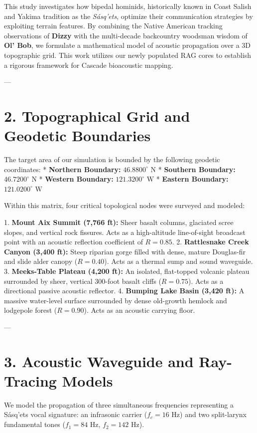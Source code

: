 \documentclass[11pt,twocolumn]{article}
\begin{document}
This study investigates how bipedal hominids, historically known in Coast Salish and Yakima tradition as the \textit{Sásq'ets}, optimize their communication strategies by exploiting terrain features. By combining the Native American tracking observations of \textbf{Dizzy} with the multi-decade backcountry woodsman wisdom of \textbf{Ol' Bob}, we formulate a mathematical model of acoustic propagation over a 3D topographic grid. This work utilizes our newly populated RAG cores to establish a rigorous framework for Cascade bioacoustic mapping.

---

\section{2. Topographical Grid and Geodetic Boundaries}
The target area of our simulation is bounded by the following geodetic coordinates:
*   \textbf{Northern Boundary:} $46.8800^{\circ}\text{ N}$
*   \textbf{Southern Boundary:} $46.7200^{\circ}\text{ N}$
*   \textbf{Western Boundary:} $121.3200^{\circ}\text{ W}$
*   \textbf{Eastern Boundary:} $121.0200^{\circ}\text{ W}$

Within this matrix, four critical topological nodes were surveyed and modeled:

1.  \textbf{Mount Aix Summit (7,766 ft):} Sheer basalt columns, glaciated scree slopes, and vertical rock fissures. Acts as a high-altitude line-of-sight broadcast point with an acoustic reflection coefficient of $R = 0.85$.
2.  \textbf{Rattlesnake Creek Canyon (3,400 ft):} Steep riparian gorge filled with dense, mature Douglas-fir and slide alder canopy ($R = 0.40$). Acts as a thermal sump and sound waveguide.
3.  \textbf{Meeks-Table Plateau (4,200 ft):} An isolated, flat-topped volcanic plateau surrounded by sheer, vertical 300-foot basalt cliffs ($R = 0.75$). Acts as a directional passive acoustic reflector.
4.  \textbf{Bumping Lake Basin (3,420 ft):} A massive water-level surface surrounded by dense old-growth hemlock and lodgepole forest ($R = 0.90$). Acts as an acoustic carrying floor.

---

\section{3. Acoustic Waveguide and Ray-Tracing Models}
We model the propagation of three simultaneous frequencies representing a Sásq'ets vocal signature: an infrasonic carrier ($f_c = 16\text{ Hz}$) and two split-larynx fundamental tones ($f_1 = 84\text{ Hz}$, $f_2 = 142\text{ Hz}$).
\end{document}

